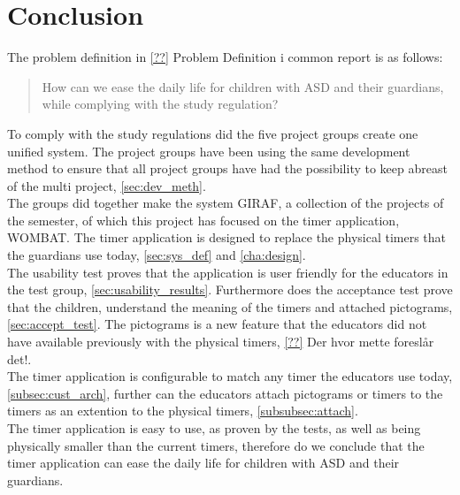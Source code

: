 \chapter{Conclusion}
The problem definition in \autoref{??} \textcolor[rgb]{1,0,0}{Problem Definition i common report} is as follows:

\begin{quotation}
How can we ease the daily life for children with ASD and their guardians, while complying with the study regulation? 
\end{quotation}


To comply with the study regulations did the five project groups create one unified system.
The project groups have been using the same development method to ensure that all project groups have had the possibility to keep abreast of the multi project, \autoref{sec:dev_meth}.\\

The groups did together make the system GIRAF, a collection of the projects of the semester, of which this project has focused on the timer application, WOMBAT.
The timer application is designed to replace the physical timers that the guardians use today, \autoref{sec:sys_def} and \autoref{cha:design}.\\

The usability test proves that the application is user friendly for the educators in the test group, \autoref{sec:usability_results}.
Furthermore does the acceptance test prove that the children, understand the meaning of the timers and attached pictograms, \autoref{sec:accept_test}. The pictograms is a new feature that the educators did not have available previously with the physical timers, \autoref{??} \textcolor[rgb]{1,0,0}{Der hvor mette foreslår det!}.\\

The timer application is configurable to match any timer the educators use today, \autoref{subsec:cust_arch}, further can the educators attach pictograms or timers to the timers as an extention to the physical timers, \autoref{subsubsec:attach}.\\ 

The timer application is easy to use, as proven by the tests, as well as being physically smaller than the current timers, therefore do we conclude that the timer application can ease the daily life for children with ASD and their guardians.\\



